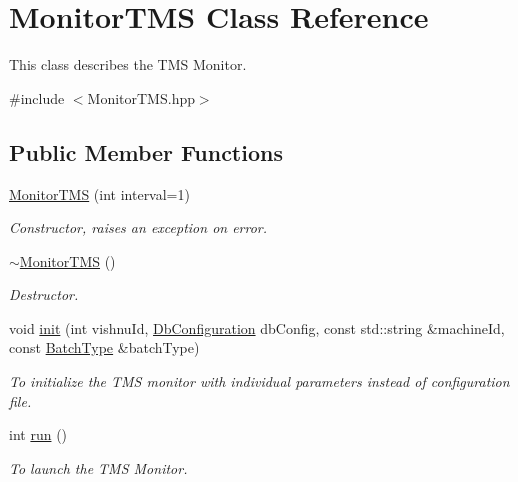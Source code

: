 \hypertarget{classMonitorTMS}{
\section{MonitorTMS Class Reference}
\label{classMonitorTMS}
}


This class describes the TMS Monitor.  




{\ttfamily \#include $<$MonitorTMS.hpp$>$}

\subsection*{Public Member Functions}
\begin{DoxyCompactItemize}
\item 
\hyperlink{classMonitorTMS_ab53b703c3d2cacdd053b804bcaa70d5f}{MonitorTMS} (int interval=1)
\begin{DoxyCompactList}\small\item\em Constructor, raises an exception on error. \item\end{DoxyCompactList}\item 
\hypertarget{classMonitorTMS_a934fc0500ed0c177ff70832f1a067321}{
\hyperlink{classMonitorTMS_a934fc0500ed0c177ff70832f1a067321}{$\sim$MonitorTMS} ()}
\label{classMonitorTMS_a934fc0500ed0c177ff70832f1a067321}

\begin{DoxyCompactList}\small\item\em Destructor. \item\end{DoxyCompactList}\item 
void \hyperlink{classMonitorTMS_ab476b3c94d741da1f571979223eb0c8d}{init} (int vishnuId, \hyperlink{classDbConfiguration}{DbConfiguration} dbConfig, const std::string \&machineId, const \hyperlink{utilVishnu_8hpp_a864d748e7097d176552dd4c7635016ea}{BatchType} \&batchType)
\begin{DoxyCompactList}\small\item\em To initialize the TMS monitor with individual parameters instead of configuration file. \item\end{DoxyCompactList}\item 
int \hyperlink{classMonitorTMS_a92a3754d82bd306ae2964db45c8774ef}{run} ()
\begin{DoxyCompactList}\small\item\em To launch the TMS Monitor. \item\end{DoxyCompactList}\end{DoxyCompactItemize}
